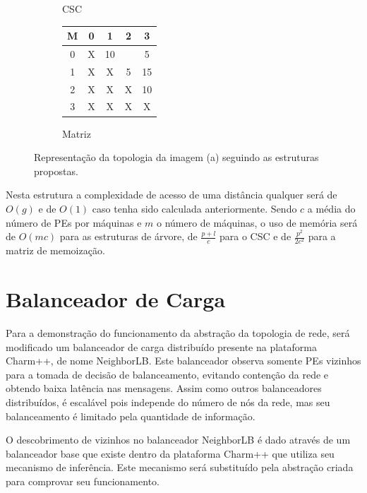 \documentclass[
	12pt,				%
	openright,			%
	twoside,			%
	a4paper,			%
	english,			%
	brazil,				%
	]{abntex2}
\newcommand{\charm}{{{Charm++}}\xspace}
\begin{document}
\begin{figure}[h]
\begin{subfigure}{.5\textwidth}
    \caption{CSC}
    \label{fig:estru:csc}
\end{subfigure}
\begin{subfigure}{.5\textwidth}
    \centering
    \begin{tabular}{|c|c|c|c|c|}
        \hline
         M & 0 & 1  & 2 & 3  \\ \hline
         0 & X & 10 &   & 5  \\ \hline
         1 & X & X  & 5 & 15 \\ \hline
         2 & X & X  & X & 10  \\ \hline
         3 & X & X  & X & X  \\ \hline
    \end{tabular}
    \caption{Matriz}
    \label{fig:estru:matriz}
\end{subfigure}
\caption[Representação das estruturas utilizadas.]{Representação da topologia da imagem (a) seguindo as estruturas propostas.}
\label{fig:estru}
\end{figure}

Nesta estrutura a complexidade de acesso de uma distância qualquer será de $O(g)$ e de $O(1)$ caso tenha sido calculada anteriormente.
Sendo $c$ a média do número de PEs por máquinas e $m$ o número de máquinas, o uso de memória será de $O(mc)$ para as estruturas de árvore, de $\frac{p+l}{c}$ para o CSC e de $\frac{p^2}{2c^2}$ para a matriz de memoização.


\section{Balanceador de Carga}
\label{sec:my_lb}

Para a demonstração do funcionamento da abstração da topologia de rede, será modificado um balanceador de carga distribuído presente na plataforma \charm, de nome NeighborLB.
Este balanceador observa somente PEs vizinhos para a tomada de decisão de balanceamento, evitando contenção da rede e obtendo baixa latência nas mensagens.
Assim como outros balanceadores distribuídos, é escalável pois independe do número de nós da rede, mas seu balanceamento é limitado pela quantidade de informação.

O descobrimento de vizinhos no balanceador NeighborLB é dado através de um balanceador base que existe dentro da plataforma \charm que utiliza seu mecanismo de inferência.
Este mecanismo será substituído pela abstração criada para comprovar seu funcionamento.
\end{document}
